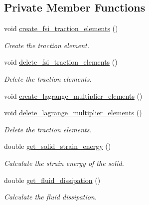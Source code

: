 \subsection*{Private Member Functions}
\begin{DoxyCompactItemize}
\item 
void \hyperlink{classUnstructuredFSIProblem_a934a587c99668fca969a72814b3142a7}{create\+\_\+fsi\+\_\+traction\+\_\+elements} ()
\begin{DoxyCompactList}\small\item\em Create the traction element. \end{DoxyCompactList}\item 
void \hyperlink{classUnstructuredFSIProblem_a94b06aac5a09774894dfab4acd972c31}{delete\+\_\+fsi\+\_\+traction\+\_\+elements} ()
\begin{DoxyCompactList}\small\item\em Delete the traction elements. \end{DoxyCompactList}\item 
void \hyperlink{classUnstructuredFSIProblem_a6f810c300f373cfc79e23d58f95944e3}{create\+\_\+lagrange\+\_\+multiplier\+\_\+elements} ()
\item 
void \hyperlink{classUnstructuredFSIProblem_ac11cb83a769e5d741e0e091b7667ec1b}{delete\+\_\+lagrange\+\_\+multiplier\+\_\+elements} ()
\begin{DoxyCompactList}\small\item\em Delete the traction elements. \end{DoxyCompactList}\item 
double \hyperlink{classUnstructuredFSIProblem_a65306eb8f4336bd673a2d364e45a3a9f}{get\+\_\+solid\+\_\+strain\+\_\+energy} ()
\begin{DoxyCompactList}\small\item\em Calculate the strain energy of the solid. \end{DoxyCompactList}\item 
double \hyperlink{classUnstructuredFSIProblem_af858e70358cf9ce9c917eb5a773cf898}{get\+\_\+fluid\+\_\+dissipation} ()
\begin{DoxyCompactList}\small\item\em Calculate the fluid dissipation. \end{DoxyCompactList}\end{DoxyCompactItemize}
